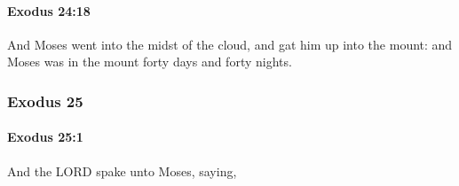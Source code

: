 		\paragraph{Exodus 24:18} %
			\label{EXODUS-24-18}

			And Moses went into the midst of the cloud, and gat him up into the mount: and Moses was in the mount forty days and forty nights.

	\subsubsection{Exodus 25} %
		\label{EXODUS-25}

		\paragraph{Exodus 25:1} %
			\label{EXODUS-25-1}

			And the LORD spake unto Moses, saying,

